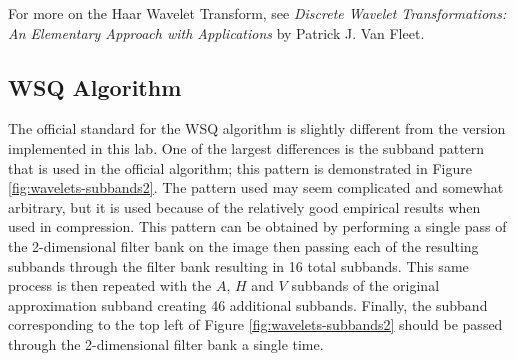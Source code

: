 For more on the Haar Wavelet Transform, see \emph{Discrete Wavelet Transformations: An Elementary Approach with Applications} by Patrick J. Van Fleet.

\subsection*{WSQ Algorithm}
The official standard for the WSQ algorithm is slightly different from the version implemented in this lab.
One of the largest differences is the subband pattern that is used in the official algorithm; this pattern is demonstrated in Figure \ref{fig:wavelets-subbands2}.
The pattern used may seem complicated and somewhat arbitrary, but it is used because of the relatively good empirical results when used in compression.
This pattern can be obtained by performing a single pass of the 2-dimensional filter bank on the image then passing each of the resulting subbands through the filter bank resulting in 16 total subbands.
This same process is then repeated with the $A$, $H$ and $V$ subbands of the original approximation subband creating 46 additional subbands.
Finally, the subband corresponding to the top left of Figure \ref{fig:wavelets-subbands2} should be passed through the 2-dimensional filter bank a single time.

\begin{comment}
We need to calculate the subband pattern found in Figure \ref{fig:wavelets-subbands2}.
This subband pattern is somewhat arbitrary, but is used because of its empirically good results in compression.
While the pattern may appear complicated at first, we can obtain the required subband coefficients rather easily.
To start, decompose the image into 16 subbands, first by using the \li{dwt2} function to split the image into four subbands, and then applying the function again to each of the four subbands.

Using the function \li{_decompose16} on the fingerprint image, you should now have a grid of 16 subbands.
Next, split each of the three subbands found in the top left corner of the subband grid into 16 additional subbands, in the same way as before.
You now have a grid of $13 + 3(16) = 61$ subbands.

Finally, take the very top left subband, and split this into four additional subbands.
You should have 64 subbands. Place them into a list in the order indicated by the numbers in Figure \ref{fig:wavelets-subbands2}.
\end{comment}

